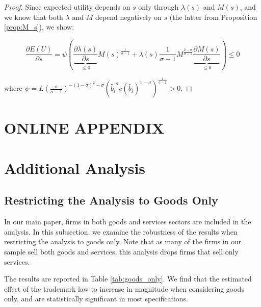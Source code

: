 \documentclass[12pt]{article}
\begin{document}
\begin{proof}
Since expected utility depends on $s$ only through $\lambda(s)$ and $M(s)$, and we know that both $\lambda$ and $M$ depend negatively on $s$  (the latter from Proposition  \ref{prop:M_s}), we show:

\begin{equation*}
\frac{\partial E(U)}{\partial s} = \psi \left( \underbrace{\frac{\partial \lambda(s)}{\partial s}}_{\leq 0}  M(s)^{\frac{1}{\sigma-1}} + \lambda(s)\frac{1}{\sigma-1} M^{\frac{2-\sigma}{\sigma -1 }} \underbrace{\frac{\partial M(s)}{\partial s}}_{\leq 0} \right) \leq 0
\end{equation*}
   
where $\psi =  L \left(\frac{\sigma}{\sigma - 1}  \right)^{-(1-\sigma)^2-\sigma}        \left( \tilde{b_i}^{\sigma}c(\tilde{b_i})^{1-\sigma} \right)^{\frac{1}{\sigma - 1}} >0$.


\end{proof}



\newpage

\section*{ONLINE APPENDIX}

\renewcommand{\thepage}{Online Appendix p. \arabic{page}}
\setcounter{page}{1} \setcounter{footnote}{0}

\bigskip

\section{Additional Analysis}

\renewcommand{\thefigure}{\thesection.\arabic{figure}}
\setcounter{figure}{0}
\renewcommand{\thetable}{\thesection.\arabic{table}}
\setcounter{table}{0}


\medskip

\subsection{Restricting the Analysis to Goods Only}

In our main paper, firms in both goods and services sectors are included in the analysis. In this subsection, we examine the robustness of the results when restricting the analysis to goods only. Note that as many of the firms in our sample sell both goods and services, this analysis drops firms that sell only services. 

The results are reported in Table \ref{tab:goods_only}. We find that the estimated effect of the trademark law to increase in magnitude when considering goods only, and are statistically significant in most specifications.
\end{document}
